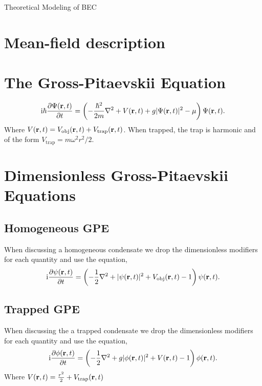 \begin{chapter}{\label{cha:theoretical_model}Theoretical Modeling of BEC}
\section{\label{section:meanfield} Mean-field description}
\section{\label{section:gpe} The Gross-Pitaevskii Equation}
	\begin{equation}
	\mathrm{i} \hbar \frac{\partial\Psi({\bf r},t)}{\partial t} = \left(-\frac{\hbar^2}{2m}\nabla^2 + V({\bf r},t) + g|\Psi({\bf r},t)|^2 - \mu \right) \Psi({\bf r},t).
	\label{eq:gpe}
	\end{equation} 
	Where $V({\bf r},t) = V_{\mathrm{obj}}({\bf r},t) + V_{\mathrm{trap}}({\bf r},t)$. When trapped, the trap is harmonic and of the form $V_{\mathrm{trap}}=m\omega^2r^2/2$.
\section{\label{section:gpedimless} Dimensionless Gross-Pitaevskii Equations}
	\subsection{\label{section:gpedimlesshomg} Homogeneous GPE}
		When discussing a homogeneous condensate we drop the dimensionless modifiers for each quantity and use the equation,
		\begin{equation}\label{eq:dimgpehomg}
		\mathrm{i}\frac{\partial\psi({\bf r},t)}{\partial t} = \left( -\frac{1}{2}\nabla^2 + |\psi({\bf r},t)|^2 + V_{\mathrm{obj}}({\bf r},t) - 1 \right) \psi({\bf r},t).
		\end{equation}
	\subsection{\label{section:gpedimlesstrap} Trapped GPE}
		When discussing the a trapped condensate we drop the dimensionless modifiers for each quantity and use the equation,
		\begin{equation}\label{eq:dimgpetrapped}
		\mathrm{i}\frac{\partial\phi({\bf r},t)}{\partial t} = \left( -\frac{1}{2}\nabla^2 + g|\phi({\bf r},t)|^2 + V({\bf r},t) - 1 \right) \phi({\bf r},t).
		\end{equation}
		Where $V({\bf r},t) = \frac{r^2}{2} + V_{\mathrm{trap}}({\bf r},t)$

\end{chapter}

